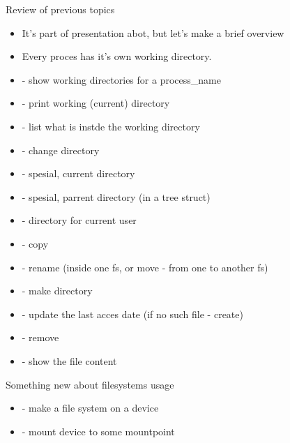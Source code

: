 \documentclass[usenames,dvipsnames,10pt,aspectratio=169]{beamer}
\begin{document}
\begin{frame}{Review of previous topics}
    \begin{itemize}
        \item It's part of presentation abot, but let's make a brief overview
        \item Every proces has it's own working directory. 
        \item {} - show working directories for a process\_name
        \item {} - print working (current) directory
        \item {} - list what is instde the working directory
        \item {} - change directory
        \item {} - spesial, current directory
        \item {} - spesial, parrent directory (in a tree struct)
        \item \ex{$\sim$/} -  directory for current user
        \item {} - copy 
        \item {} - rename (inside one fs, or move - from one to another fs)
        \item {} - make directory
        \item {} - update the last acces date (if no such file - create)
        \item {} - remove
        \item {} - show the file content
    \end{itemize}
\end{frame}



\begin{frame}{Something new about filesystems usage}
    \begin{itemize}
        \item {} - make a file system on a device
        \item {} - mount device to some mountpoint 
        
    \end{itemize}
\end{frame}
\end{document}
